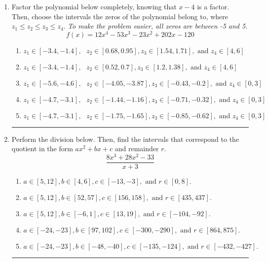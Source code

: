 \documentclass[14pt]{extbook}
\newcommand{\litem}[1]{\item#1\hspace*{-1cm}\rule{\textwidth}{0.4pt}}
\begin{document}
\begin{enumerate}
{\begin{enumerate}[label=\Alph*.]
\end{enumerate} }
\litem{
Factor the polynomial below completely, knowing that $x -4$ is a factor. Then, choose the intervals the zeros of the polynomial belong to, where $z_1 \leq z_2 \leq z_3 \leq z_4$. \textit{To make the problem easier, all zeros are between -5 and 5.}\[ f(x) = 12x^{4} -53 x^{3} -23 x^{2} +202 x -120 \]\begin{enumerate}[label=\Alph*.]
\item \( z_1 \in [-3.4, -1.4], \text{   }  z_2 \in [0.68, 0.95], z_3 \in [1.54, 1.71], \text{   and   } z_4 \in [4, 6] \)
\item \( z_1 \in [-3.4, -1.4], \text{   }  z_2 \in [0.52, 0.7], z_3 \in [1.2, 1.38], \text{   and   } z_4 \in [4, 6] \)
\item \( z_1 \in [-5.6, -4.6], \text{   }  z_2 \in [-4.05, -3.87], z_3 \in [-0.43, -0.2], \text{   and   } z_4 \in [0, 3] \)
\item \( z_1 \in [-4.7, -3.1], \text{   }  z_2 \in [-1.44, -1.16], z_3 \in [-0.71, -0.32], \text{   and   } z_4 \in [0, 3] \)
\item \( z_1 \in [-4.7, -3.1], \text{   }  z_2 \in [-1.75, -1.65], z_3 \in [-0.85, -0.62], \text{   and   } z_4 \in [0, 3] \)

\end{enumerate} }
\litem{
Perform the division below. Then, find the intervals that correspond to the quotient in the form $ax^2+bx+c$ and remainder $r$.\[ \frac{8x^{3} +28 x^{2} -33}{x + 3} \]\begin{enumerate}[label=\Alph*.]
\item \( a \in [5, 12], b \in [4, 6], c \in [-13, -3], \text{ and } r \in [0, 8]. \)
\item \( a \in [5, 12], b \in [52, 57], c \in [156, 158], \text{ and } r \in [435, 437]. \)
\item \( a \in [5, 12], b \in [-6, 1], c \in [13, 19], \text{ and } r \in [-104, -92]. \)
\item \( a \in [-24, -23], b \in [97, 102], c \in [-300, -290], \text{ and } r \in [864, 875]. \)
\item \( a \in [-24, -23], b \in [-48, -40], c \in [-135, -124], \text{ and } r \in [-432, -427]. \)


\end{enumerate}}
\end{enumerate}
\end{document}
